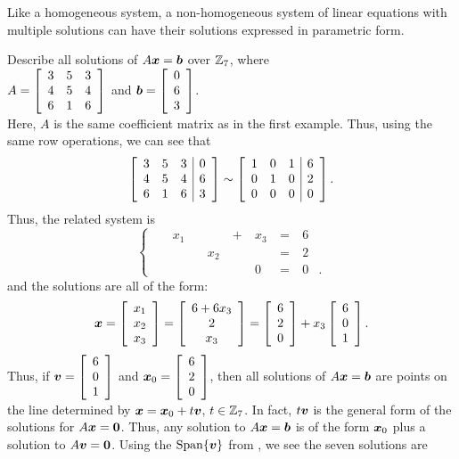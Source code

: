 Like a homogeneous system, a non-homogeneous system of linear equations with multiple solutions can have their solutions expressed in parametric form.\\

\begin{Exam}\label{exam:solutionset} Describe all solutions of $A\bb x = \bb b$ over $\Z_7$, where\\
$A = \mtx{rrrr}{3&5&3\\4&5&4\\6&1&6}$ and $\bb b = \vr{0 \\ 6 \\ 3}$.\\

Here, $A$ is the same coefficient matrix as in the first example. Thus, using the same row operations, we can see that 
\[\mtx{rrr|r}{3&5&3&0\\4&5&4&6\\6&1&6&3} \sim \mtx{rrr|r}{1 & 0 & 1 & 6\\ 0 & 1 & 0 & 2\\ 0 & 0 & 0 & 0}.\] Thus, the related system is \[\left\{\begin{alignedat}{100}
&& x_1\ & &&+\ &x_3\ &=\ &6&\\
&&&&x_2\ &&&=\ &2&\\
&&&&&&0\ &=\ &0&.
\end{alignedat}\right.\] and the solutions are all of the form:
\[\bb x = \vr{x_1 \\ x_2 \\ x_3} = \mtx{c}{6+6x_3 \\ 2 \\ x_3} = \vr{6\\ 2 \\ 0 } + x_3\vr{6\\ 0 \\ 1}.\] Thus, if  $\bb v = \vr{6 \\ 0 \\ 1}$ and $\bb x_0 = \vr{6\\2\\0}$, then all solutions of $A\bb x = \bb b$ are points on the line determined by $\bb x = \bb x_0 + t\bb v$, $t\in \Z_7$. In fact, $t\bb v$ is the general form of the solutions for $A\bb x = \bb 0$. Thus, any solution to $A\bb x = \bb b$ is of the form $\bb x_0$ plus a solution to $A\bb v = \bb 0$. Using the $\Span\{\bb v\}$ from , we see the seven solutions are 

\end{Exam}
